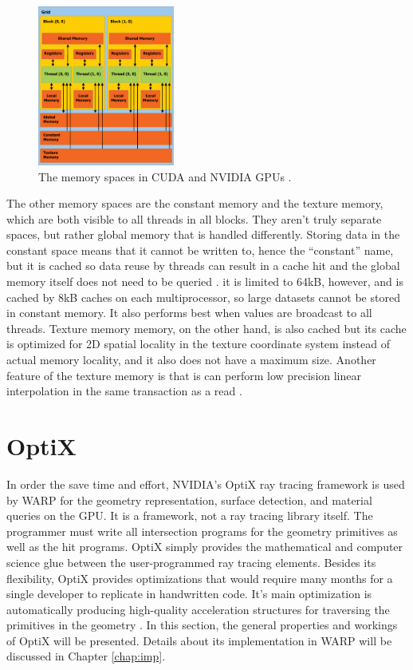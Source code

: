 \begin{figure}[h!] 
  \centering
    \includegraphics[width=0.4\textwidth]{graphics/CUDA_memory.eps}
     \caption[The memory spaces in CUDA and NVIDIA GPUs.]{The memory spaces in CUDA and NVIDIA GPUs \cite{cuda}. \label{cuda_mem}}
\end{figure}

The other memory spaces are the constant memory and the texture memory, which are both visible to all threads in all blocks.  They aren't truly separate spaces, but rather global memory that is handled differently.  Storing data in the constant space means that it cannot be written to, hence the ``constant'' name, but it is cached so data reuse by threads can result in a cache hit and the global memory itself does not need to be queried \cite{cuda}.  it is limited to 64kB, however, and is cached by 8kB caches on each multiprocessor, so large datasets cannot be stored in constant memory.  It also performs best when values are broadcast to all threads.  Texture memory memory, on the other hand, is also cached but its cache is optimized for 2D spatial locality in the texture coordinate system instead of actual memory locality, and it also does not have a maximum size.  Another feature of the texture memory is that is can perform low precision linear interpolation in the same transaction as a read \cite{cuda}.

\section{OptiX}

In order the save time and effort, NVIDIA's OptiX ray tracing framework is used by WARP for the geometry representation, surface detection, and material queries on the GPU.  It is a framework, not a ray tracing library itself.  The programmer must write all intersection programs for the geometry primitives as well as the hit programs.  OptiX simply provides the mathematical and computer science glue between the user-programmed ray tracing elements.  Besides its flexibility, OptiX provides optimizations that would require many months for a single developer to replicate in handwritten code.  It's main optimization is automatically producing high-quality acceleration structures for traversing the primitives in the geometry \cite{optix}.  In this section, the general properties and workings of OptiX will be presented.  Details about its implementation in WARP will be discussed in Chapter \ref{chap:imp}.

